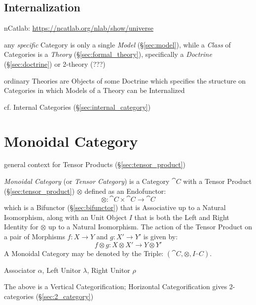 


\subsection{Internalization}\label{sec:internalization}

nCatlab: \url{https://ncatlab.org/nlab/show/universe}

any \emph{specific} Category is only a single \emph{Model}
(\S\ref{sec:model}), while a \emph{Class} of Categories is a
\emph{Theory} (\S\ref{sec:formal_theory}), specifically a
\emph{Doctrine} (\S\ref{sec:doctrine}) or 2-theory (???)

ordinary Theories are Objects of some Doctrine which specifies the
structure on Categories in which Models of a Theory can be
Internalized

\fist cf. Internal Categories (\S\ref{sec:internal_category})



\section{Monoidal Category}\label{sec:monoidal_category}

general context for Tensor Products (\S\ref{sec:tensor_product})

\emph{Monoidal Category} (or \emph{Tensor Category}) is a Category
$\cat{C}$ with a Tensor Product (\S\ref{sec:tensor_product})
$\otimes$ defined as an Endofunctor:
\[
  \otimes : \cat{C} \times \cat{C} \rightarrow \cat{C}
\]
which is a Bifunctor (\S\ref{sec:bifunctor}) that is Associative up to
a Natural Isomorphism, along with an Unit Object $I$ that is both the
Left and Right Identity for $\otimes$ up to a Natural Isomorphism. The
action of the Tensor Product on a pair of Morphisms $f : X \rightarrow
Y$ and $g : X' \rightarrow Y'$ is given by:
\[
  f \otimes g : X \otimes X' \rightarrow Y \otimes Y'
\]
A Monoidal Category may be denoted by the Triple: $(\cat{C},
\otimes, I_\cat{C})$.

Associator $\alpha$, Left Unitor $\lambda$, Right Unitor $\rho$

The above is a Vertical Categorification; Horizontal Categorification
gives $2$-categories (\S\ref{sec:2_category})

